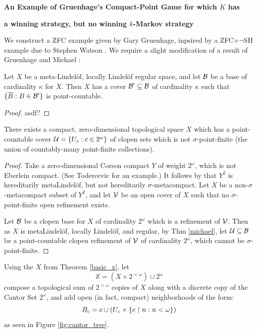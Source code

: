 





\centerline{\bf An Example of Gruenhage's Compact-Point Game for which $K$ has }
\centerline{\bf a winning strategy, but no winning $k$-Markov strategy}

We construct a ZFC example given by Gary Gruenhage, inpsired by a ZFC+$\lnot$SH example due to Stephen Watson \cite{Watson}. We require a slight modification of a result of Gruenhage and Michael \cite{Michael}:

\begin{theorem}\label{michael}
Let $X$ be a meta-Lindel\"of, locally Lindel\"of regular space, and let $\mathcal{B}$ be a base of cardinality $\kappa$ for $X$. Then $X$ has a cover $\mathcal{B}'\subseteq\mathcal{B}$ of cardinality $\kappa$ such that $\{\overline{B}:B\in\mathcal{B}'\}$ is point-countable.
\end{theorem}

\begin{proof}
asdf?
\end{proof}

\begin{theorem}\label{basic_x}
There exists a compact, zero-dimensional topological space $X$ which has a point-countable cover $\mathcal{U} = \{U_c : c \in 2^\omega\}$ of clopen sets which is not $\sigma$-point-finite (the union of countably-many point-finite collections).
\end{theorem}

\begin{proof}
Take a zero-dimensional Corson compact $Y$ of weight $2^\omega$, which is not Eberlein compact. (See Todercevic \cite{Todercevic} for an example.) It follows by \cite{G1} that $Y^2$ is hereditarily metaLindel\"of, but not hereditarily $\sigma$-metacompact. Let $X$ be a non-$\sigma$-metacompact subset of $Y^2$, and let $\mathcal{V}$ be an open cover of $X$ such that no $\sigma$-point-finite open refinement exists.

Let $\mathcal{B}$ be a clopen base for $X$ of cardinality $2^\omega$ which is a refinement of $\mathcal{V}$.  Then as $X$ is metaLindel\"of, locally Lindel\"of, and regular, by Thm \ref{michael}, let $\mathcal{U}\subseteq \mathcal{B}$ be a point-countable clopen refinement of $\mathcal{V}$ of cardinality $2^\omega$, which cannot be $\sigma$-point-finite.
\end{proof}

\begin{definition}
Using the $X$ from Theorem \ref{basic_x}, let \[\mathbb{X} = (X \times 2^{<\omega}) \cup 2^\omega\] compose a topological sum of $2^{<\omega}$ copies of $X$ along with a discrete copy of the Cantor Set $2^\omega$, and add open (in fact, compact) neighborhoods of the form: 
  \[
    B_c = c \cup (U_c \times \{c\restriction n : n < \omega\})
  \]
as seen in Figure \ref{fig:cantor_tree}.
\end{definition}

